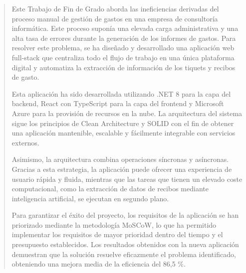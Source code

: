 \renewcommand{\abstractname}{Resumen}

\begin{abstract}
Este Trabajo de Fin de Grado aborda las ineficiencias derivadas del proceso manual de gestión de gastos en una empresa de consultoría informática. Este proceso suponía una elevada carga administrativa y una alta tasa de errores durante la generación de los informes de gastos. Para resolver este problema, se ha diseñado y desarrollado una aplicación web full-stack que centraliza todo el flujo de trabajo en una única plataforma digital y automatiza la extracción de información de los tiquets y recibos de gasto.

Esta aplicación ha sido desarrollada utilizando .NET 8 para la capa del backend, React con TypeScript para la capa del frontend y Microsoft Azure para la provisión de recursos en la nube. La arquitectura del sistema sigue los principios de Clean Architecture y SOLID con el fin de obtener una aplicación mantenible, escalable y fácilmente integrable con servicios externos. 

Asimismo, la arquitectura combina operaciones síncronas y asíncronas. Gracias a esta estrategia, la aplicación puede ofrecer una experiencia de usuario rápida y fluida, mientras que las tareas que tienen un elevado coste computacional, como la extracción de datos de recibos mediante inteligencia artificial, se ejecutan en segundo plano.

Para garantizar el éxito del proyecto, los requisitos de la aplicación se han priorizado mediante la metodología MoSCoW, lo que ha permitido implementar los requisitos de mayor prioridad dentro del tiempo y el presupuesto establecidos. Los resultados obtenidos con la nueva aplicación demuestran que la solución resuelve eficazmente el problema identificado, obteniendo una mejora media de la eficiencia del 86,5 \%.
\end{abstract}